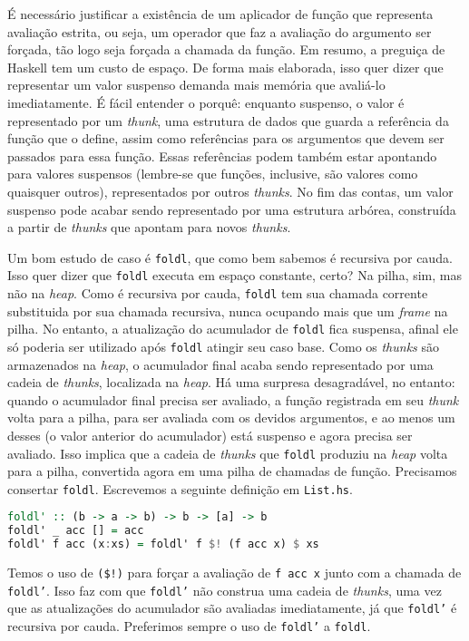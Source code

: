 \documentclass[a4paper]{article}
\begin{document}
É necessário justificar a existência de um aplicador de função que representa avaliação estrita, ou seja, um operador que faz a avaliação do argumento ser forçada, tão logo seja forçada a chamada da função.
Em resumo, a preguiça de Haskell tem um custo de espaço.
De forma mais elaborada, isso quer dizer que representar um valor suspenso demanda mais memória que avaliá-lo imediatamente.
É fácil entender o porquê: enquanto suspenso, o valor é representado por um \emph{thunk}, uma estrutura de dados que guarda a referência da função que o define, assim como referências para os argumentos que devem ser passados para essa função.
Essas referências podem também estar apontando para valores suspensos (lembre-se que funções, inclusive, são valores como quaisquer outros), representados por outros \emph{thunks}.
No fim das contas, um valor suspenso pode acabar sendo representado por uma estrutura arbórea, construída a partir de \emph{thunks} que apontam para novos \emph{thunks}.

Um bom estudo de caso é \texttt{foldl}, que como bem sabemos é recursiva por cauda.
Isso quer dizer que \texttt{foldl} executa em espaço constante, certo?
Na pilha, sim, mas não na \emph{heap}.
Como é recursiva por cauda, \texttt{foldl} tem sua chamada corrente substituida por sua chamada recursiva, nunca ocupando mais que um \emph{frame} na pilha.
No entanto, a atualização do acumulador de \texttt{foldl} fica suspensa, afinal ele só poderia ser utilizado após \texttt{foldl} atingir seu caso base.
Como os \emph{thunks} são armazenados na \emph{heap}, o acumulador final acaba sendo representado por uma cadeia de \emph{thunks}, localizada na \emph{heap}.
Há uma surpresa desagradável, no entanto: quando o acumulador final precisa ser avaliado, a função registrada em seu \emph{thunk} volta para a pilha, para ser avaliada com os devidos argumentos, e ao menos um desses (o valor anterior do acumulador) está suspenso e agora precisa ser avaliado.
Isso implica que a cadeia de \emph{thunks} que \texttt{foldl} produziu na \emph{heap} volta para a pilha, convertida agora em uma pilha de chamadas de função.
Precisamos consertar \texttt{foldl}.
Escrevemos a seguinte definição em \texttt{List.hs}.

\begin{lstlisting}[language=haskell, frame=single]
foldl' :: (b -> a -> b) -> b -> [a] -> b
foldl' _ acc [] = acc
foldl' f acc (x:xs) = foldl' f $! (f acc x) $ xs
\end{lstlisting}

Temos o uso de \texttt{(\$!)} para forçar a avaliação de \texttt{f acc x} junto com a chamada de \texttt{foldl'}.
Isso faz com que \texttt{foldl'} não construa uma cadeia de \emph{thunks}, uma vez que as atualizações do acumulador são avaliadas imediatamente, já que \texttt{foldl'} é recursiva por cauda.
Preferimos sempre o uso de \texttt{foldl'} a \texttt{foldl}.
\end{document}

